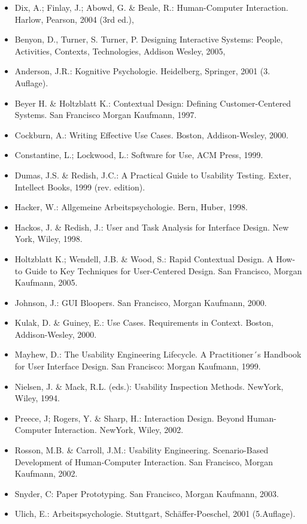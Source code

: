\begin{itemize}
\tightlist
\item
  Dix, A.; Finlay, J.; Abowd, G. \& Beale, R.: Human-Computer
  Interaction. Harlow, Pearson, 2004 (3rd ed.),
\item
  Benyon, D., Turner, S. Turner, P. Designing Interactive Systems:
  People, Activities, Contexts, Technologies, Addison Wesley, 2005,
\item
  Anderson, J.R.: Kognitive Psychologie. Heidelberg, Springer, 2001 (3.
  Auflage).
\item
  Beyer H. \& Holtzblatt K.: Contextual Design: Defining
  Customer-Centered Systems. San Francisco Morgan Kaufmann, 1997.
\item
  Cockburn, A.: Writing Effective Use Cases. Boston, Addison-Wesley,
  2000.
\item
  Constantine, L.; Lockwood, L.: Software for Use, ACM Press, 1999.
\item
  Dumas, J.S. \& Redish, J.C.: A Practical Guide to Usability Testing.
  Exter, Intellect Books, 1999 (rev. edition).
\item
  Hacker, W.: Allgemeine Arbeitspsychologie. Bern, Huber, 1998.
\item
  Hackos, J. \& Redish, J.: User and Task Analysis for Interface Design.
  New York, Wiley, 1998.
\item
  Holtzblatt K.; Wendell, J.B. \& Wood, S.: Rapid Contextual Design. A
  How-to Guide to Key Techniques for User-Centered Design. San
  Francisco, Morgan Kaufmann, 2005.
\item
  Johnson, J.: GUI Bloopers. San Francisco, Morgan Kaufmann, 2000.
\item
  Kulak, D. \& Guiney, E.: Use Cases. Requirements in Context. Boston,
  Addison-Wesley, 2000.
\item
  Mayhew, D.: The Usability Engineering Lifecycle. A Practitioner´s
  Handbook for User Interface Design. San Francisco: Morgan Kaufmann,
  1999.
\item
  Nielsen, J. \& Mack, R.L. (eds.): Usability Inspection Methods.
  NewYork, Wiley, 1994.
\item
  Preece, J; Rogers, Y. \& Sharp, H.: Interaction Design. Beyond
  Human-Computer Interaction. NewYork, Wiley, 2002.
\item
  Rosson, M.B. \& Carroll, J.M.: Usability Engineering. Scenario-Based
  Development of Human-Computer Interaction. San Francisco, Morgan
  Kaufmann, 2002.
\item
  Snyder, C: Paper Prototyping. San Francisco, Morgan Kaufmann, 2003.
\item
  Ulich, E.: Arbeitspsychologie. Stuttgart, Schäffer-Poeschel, 2001
  (5.Auflage).
\end{itemize}

